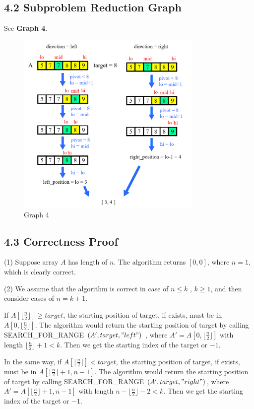 \documentclass[UTF8]{ctexart}
\begin{document}
\subsection*{4.2 Subproblem Reduction Graph} 
See \textbf{Graph 4}.
\begin{figure} [htbp]
	\centering
	\caption*{Graph 4}
	\includegraphics[width=0.8\textwidth]{figs/4.png}
\end{figure}
\subsection*{4.3 Correctness Proof} 
(1) Suppose array $A$ has length of $n$. The algorithm returns $[0, 0]$, where $ n = 1$, which is clearly correct.

(2) We assume that the algorithm is correct in case of $n \leq k$ , $k\geq 1$, and then consider cases of $n = k + 1$.

If $A[\lfloor \frac{n}{2}\rfloor] \geq target$, the starting position of target, if exists, must be in $A[0, \lfloor \frac{n}{2}\rfloor]$. The algorithm would
return the starting position of target by calling SEARCH\_FOR\_RANGE $(A', target, "left")$ , where $A' = A[0, \lfloor \frac{n}{2}\rfloor]$ with length $\lfloor \frac{n}{2}\rfloor + 1 < k$.
Then we get the starting index of the target or $-1$.

In the same way, if $A[\lfloor \frac{n}{2}\rfloor] < target$, the starting position of target, if exists, must be in $A[\lfloor \frac{n}{2}\rfloor+1, n-1]$. The algorithm would
return the starting position of target by calling SEARCH\_FOR\_RANGE $(A', target, "right")$, where $A' = A[\lfloor \frac{n}{2}\rfloor+1, n-1]$ with length $n - \lfloor \frac{n}{2}\rfloor - 2 < k$.
Then we get the starting index of the target or $-1$.
\end{document}
